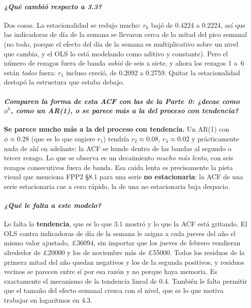 \documentclass[11pt]{article}
\newcommand{\gbp}{\pounds}
\begin{document}
\paragraph{{\normalfont\itshape ¿Qu\'e cambi\'o respecto a 3.3?}} Dos cosas.
La estacionalidad se redujo mucho: $r_6$ baj\'o de \num{0.4224} a
\num{0.2224}, as\'i que las indicadoras de d\'ia de la semana se llevaron
cerca de la mitad del pico semanal (no todo, porque el efecto del d\'ia de la
semana es multiplicativo sobre un nivel que cambia, y el OLS lo est\'a
modelando como aditivo y constante). Pero el n\'umero de rezagos fuera de
banda \emph{subi\'o} de seis a siete, y ahora los rezagos \num{1} a~\num{6}
est\'an \emph{todos} fuera: $r_1$ incluso creci\'o, de \num{0.2092} a
\num{0.2759}. Quitar la estacionalidad destap\'o la estructura que estaba
debajo.

\paragraph{{\normalfont\itshape Comparen la forma de esta ACF con las de la
Parte~0: ¿decae como $\phi^k$, como un AR(1), o se parece m\'as a la del
proceso con tendencia?}} \textbf{Se parece mucho m\'as a la del proceso con
tendencia.} Un AR(1) con $\phi \approx \num{0.28}$ (que es lo que sugiere
$r_1$) tendr\'ia $r_2 \approx \num{0.08}$, $r_3 \approx \num{0.02}$ y
pr\'acticamente nada de ah\'i en adelante: la ACF se hunde dentro de las
bandas al segundo o tercer rezago. Lo que se observa es un decaimiento
\emph{mucho m\'as lento}, con seis rezagos consecutivos fuera de banda. Esa
caida lenta es precisamente la pista visual que menciona FPP2 \S8.1 para una
serie \textbf{no estacionaria}: la ACF de una serie estacionaria cae a cero
r\'apido, la de una no estacionaria baja despacio.

\paragraph{{\normalfont\itshape ¿Qu\'e le falta a este modelo?}} Le falta la
\textbf{tendencia}, que es lo que 3.1 mostr\'o y lo que la ACF est\'a
gritando. El OLS contra indicadoras de d\'ia de la semana le asigna a cada
jueves del a\~no el mismo valor ajustado, \gbp\num{36094}, sin importar que
los jueves de febrero vendieran alrededor de \gbp\num{20000} y los de
noviembre m\'as de \gbp\num{55000}. Todos los residuos de la primera mitad
del a\~no quedan negativos y los de la segunda positivos, y residuos vecinos
se parecen entre s\'i por esa raz\'on y no porque haya memoria. Es
exactamente el mecanismo de la tendencia lineal de 0.4. Tambi\'en le falta
permitir que el tama\~no del efecto semanal crezca con el nivel, que es lo
que motiva trabajar en logaritmos en 4.3.
\end{document}
